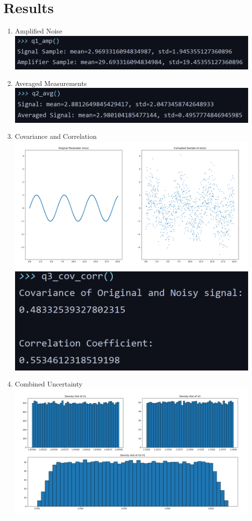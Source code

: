 \documentclass[11pt]{article}
\begin{document}
\section{Results}
\begin{enumerate}
        \item Amplified Noise \\
        \includegraphics[width=\linewidth]{inc/q1_out.png}
        \item Averaged Measurements \\
        \includegraphics[width=\linewidth]{inc/q2_out.png}
        \item Covariance and Correlation \\
        \includegraphics[width=\linewidth]{inc/q3_plot.png} \\
        \includegraphics[width=0.5\linewidth]{inc/q3_out.png}
        \item Combined Uncertainty \\
        \includegraphics[width=\linewidth]{inc/q4_plot.png} \\

\end{enumerate}
\end{document}
